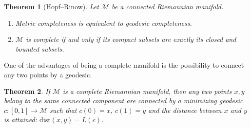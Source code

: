 \documentclass[10pt,a4paper]{book}
\theoremstyle{definition}
\theoremstyle{plain}
\newtheorem{thm}{Theorem}[section]
\theoremstyle{remark}
\newcommand \M {\mathcal{M}}
\begin{document}
\begin{thm}[Hopf--Rinow]
Let $\M$ be a \emph{connected} Riemannian manifold.
\begin{enumerate}
\item[(i)] Metric completeness is equivalent to geodesic completeness.
\item[(ii)] $\M$ is complete if and only if its compact subsets are exactly its closed and bounded subsets.
\end{enumerate}
\end{thm}
One of the advantages of being a complete manifold is the possibility to connect any two points by a geodesic.
\begin{thm}
If $\M$ is a complete Riemannian manifold, then any two points $x,y$ belong to the same connected component are connected by a minimizing geodesic $c:[0,1]\to \M$ such that $c(0)=x,~c(1)=y$ and the distance between $x$ and $y$ is attained: $\text{dist}(x,y)=L(c)$. 
\end{thm}
\end{document}

